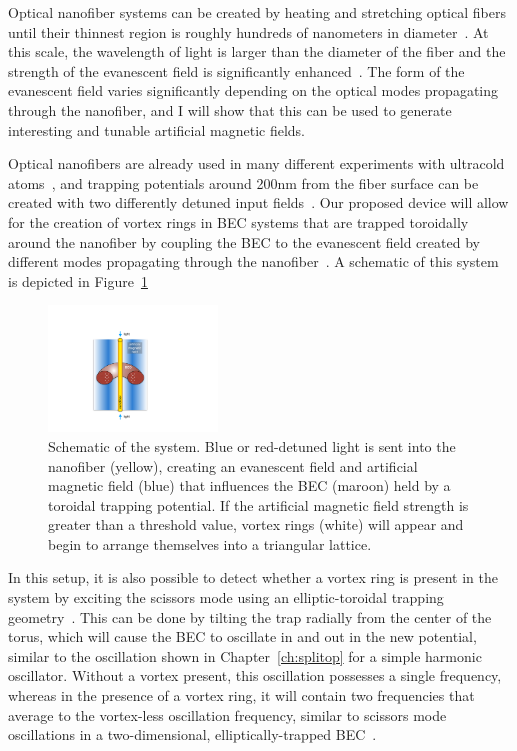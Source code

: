 Optical nanofiber systems can be created by heating and stretching optical fibers until their thinnest region is roughly hundreds of nanometers in diameter~\cite{ward2006, tong2003}.
At this scale, the wavelength of light is larger than the diameter of the fiber and the strength of the evanescent field is significantly enhanced~\cite{yariv1997}.
The form of the evanescent field varies significantly depending on the optical modes propagating through the nanofiber, and I will show that this can be used to generate interesting and tunable artificial magnetic fields.

Optical nanofibers are already used in many different experiments with ultracold atoms~\cite{vetsch2010, lacroute2012, nieddu2016, sague2007, russell2011, kumar2015}, and trapping potentials around 200nm from the fiber surface can be created with two differently detuned input fields~\cite{kien2004, phelan2013}.
Our proposed device will allow for the creation of vortex rings in BEC systems that are trapped toroidally around the nanofiber by coupling the BEC to the evanescent field created by different modes propagating through the nanofiber~\cite{sachdeva2017}.
A schematic of this system is depicted in Figure~\ref{fig:device}

\begin{figure}[t]
\begin{center}
\includegraphics[width=0.4\textwidth]{data/3d/Schematic_TB}
\end{center}
\caption{Schematic of the system. Blue or red-detuned light is sent into the nanofiber (yellow), creating an evanescent field and artificial magnetic field (blue) that influences the BEC (maroon) held by a toroidal trapping potential. If the artificial magnetic field strength is greater than a threshold value, vortex rings (white) will appear and begin to arrange themselves into a triangular lattice.}
\label{fig:device}
\end{figure}

In this setup, it is also possible to detect whether a vortex ring is present in the system by exciting the scissors mode using an elliptic-toroidal trapping geometry~\cite{cozzini2003, guery1999, marago2000}.
This can be done by tilting the trap radially from the center of the torus, which will cause the BEC to oscillate in and out in the new potential, similar to the oscillation shown in Chapter~\ref{ch:splitop} for a simple harmonic oscillator.
Without a vortex present, this oscillation possesses a single frequency, whereas in the presence of a vortex ring, it will contain two frequencies that average to the vortex-less oscillation frequency, similar to scissors mode oscillations in a two-dimensional, elliptically-trapped BEC~\cite{smith2004, zambelli1998, stringari2001}.

